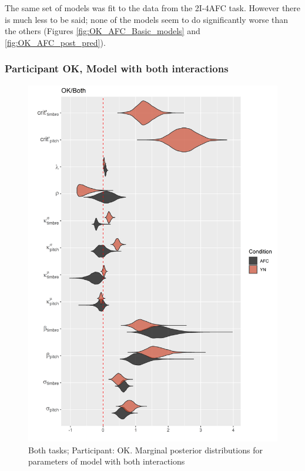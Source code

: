 \documentclass{article}\usepackage{knitr}
\begin{document}
The same set of models was fit to the data from the 2I-4AFC task. However there is much less to be said; none of the models seem to do significantly worse than the others (Figures \ref{fig:OK_AFC_Basic_models} and \ref{fig:OK_AFC_post_pred}).

\subsubsection{Participant OK, Model with both interactions}

\begin{figure}[H]
\centering
\includegraphics[scale=0.75, angle = 0]{Analysis_of_Human_Data/OK_YN_AFC_Both}
\caption{Both tasks; Participant: OK. Marginal posterior distributions for parameters of model with both interactions}
\label{fig:OK_YN_AFC_Both}
\end{figure}
\end{document}
